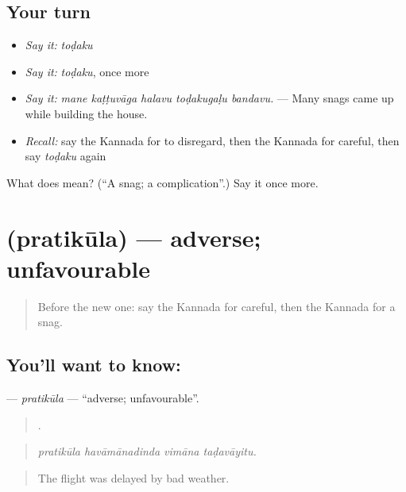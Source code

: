 \subsection*{Your turn}
\begin{itemize}
\raggedright
  \item \emph{Say it:} \emph{toḍaku}
  \item \emph{Say it:} \emph{toḍaku}, once more
  \item \emph{Say it:} \emph{mane kaṭṭuvāga halavu toḍakugaḷu bandavu.} — Many snags came up while building the house.
  \item \emph{Recall:} say the Kannada for to disregard, then the Kannada for careful, then say \emph{toḍaku} again
\end{itemize}

\begin{tcolorbox}[breakable,colback=teal!4,colframe=teal!35!black,title={Before you move on}]
What does  mean? (\textquotedblleft{}A snag; a complication\textquotedblright{}.) Say it once more.
\end{tcolorbox}
\section[\texorpdfstring{\kn{ಪ್ರತಿಕೂಲ} (pratikūla)}{ಪ್ರತಿಕೂಲ (pratikūla)}]{ (pratikūla) — adverse; unfavourable}

\label{lesson:KA-C426-pratikula}



\begin{quote}
Before the new one: say the Kannada for careful, then the Kannada for a snag.
\end{quote}

\subsection*{You'll want to know: }
\textbf{} — \emph{pratikūla} — \textquotedblleft{}adverse; unfavourable\textquotedblright{}.

\begin{quote}
   .
\end{quote}

\begin{quote}
\emph{pratikūla havāmānadinda vimāna taḍavāyitu.}
\end{quote}

\begin{quote}
The flight was delayed by bad weather.
\end{quote}

